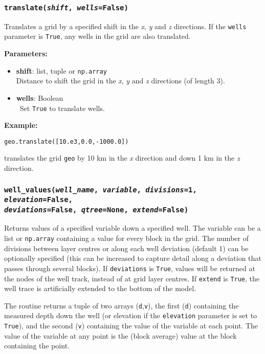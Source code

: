 \subsubsection{\texttt{translate(\emph{shift}, \emph{wells}=\texttt{False})}}

Translates a grid by a specified shift in the \emph{x}, \emph{y} and \emph{z} directions.  If the \texttt{wells} parameter is \texttt{True}, any wells in the grid are also translated.

\textbf{Parameters:}
\begin{itemize}
  \item \textbf{shift}: list, tuple or \texttt{np.array}\\
    Distance to shift the grid in the \emph{x}, \emph{y} and \emph{z} directions (of length 3).
  \item \textbf{wells}: Boolean\\\
    Set \texttt{True} to translate wells.
\end{itemize}

\textbf{Example:}

\begin{verbatim}
geo.translate([10.e3,0.0,-1000.0])
\end{verbatim}

translates the grid \texttt{geo} by 10 km in the \emph{x} direction and down 1 km in the \emph{z} direction.

\subsubsection{\texttt{well\_values(\emph{well\_name}, \emph{variable}, \emph{divisions}=1, \emph{elevation}=\texttt{False}, \\
    \emph{deviations}=\texttt{False}, \emph{qtree}=None, \emph{extend}=\texttt{False})}}

Returns values of a specified variable down a specified well.  The variable can be a list or \texttt{np.array} containing a value for every block in the grid.  The number of divisions between layer centres or along each well deviation (default 1) can be optionally specified (this can be increased to capture detail along a deviation that passes through several blocks).  If \texttt{deviations} is \texttt{True}, values will be returned at the nodes of the well track, instead of at grid layer centres.  If \texttt{extend} is \texttt{True}, the well trace is artificially extended to the bottom of the model.

The routine returns a tuple of two arrays (\texttt{d},\texttt{v}), the first (\texttt{d}) containing the measured depth down the well (or elevation if the \texttt{elevation} parameter is set to \texttt{True}), and the second (\texttt{v}) containing the value of the variable at each point.  The value of the variable at any point is the (block average) value at the block containing the point.

